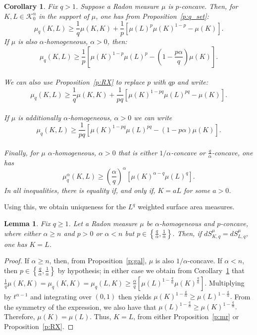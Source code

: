 \documentclass[11pt]{amsart}
\newtheorem{lemma}[theorem]{Lemma}
\newtheorem{corollary}[theorem]{Corollary}
\theoremstyle{definition}
\theoremstyle{remark}
\numberwithin{equation}{section}
\newcommand{\conbod}{\mathcal{K}^n}
\begin{document}
\begin{corollary}
\label{q_min_p}
Fix $q > 1$. Suppose a Radon measure $\mu$ is $p$-concave. Then, for $K,L\in\conbod_0$ in the support of $\mu$, one has from Proposition~\ref{p:q_set}:
$$\mu_q(K,L)\geq \frac{1}{q}\mu(K,K)+\frac{1}{p}\left[\mu(L)^p\mu(K)^{1-p}-\mu(K)\right].$$
If $\mu$ is also $\alpha$-homogeneous, $\alpha>0$, then:
$$\mu_q(K,L)\geq \frac{1}{p}\left[\mu(K)^{1-p}\mu(L)^{p}-\left(1-\frac{p\alpha}{q}\right)\mu(K)\right].$$
\\
We can also use Proposition~\ref{p:RX} to replace $p$ with $qp$ and write:
$$\mu_q(K,L)\geq \frac{1}{q}\mu(K,K)+ \frac{1}{pq}\left[\mu(K)^{1-pq}\mu(L)^{pq}-\mu(K)\right].$$
\\
If $\mu$ is additionally $\alpha$-homogeneous, $\alpha>0$ we can write
$$\mu_q(K,L)\geq  \frac{1}{pq}\left[\mu(K)^{1-pq}\mu(L)^{pq}-(1-p\alpha)\mu(K)\right].$$
\\
Finally, for $\mu$ $\alpha$-homogeneous, $\alpha>0$ that is either $1/\alpha$-concave or $\frac{q}{\alpha}$-concave, one has 
$$\mu^{\alpha}_q(K,L)\geq \left(\frac{\alpha}{q}\right)^{\alpha}\left[\mu(K)^{\alpha-q}\mu(L)^{q}\right].$$
In all inequalities, there is equality if, and only if, $K=aL$ for some $a>0$.
\end{corollary}
Using this, we obtain uniqueness for the $L^q$ weighted surface area measures.
\begin{lemma}
\label{l:q_meas_uni}
Fix $q\geq 1$. Let a Radon measure $\mu$ be $\alpha$-homogeneous and $p$-concave, where either $\alpha\geq n$ and $p>0$ or $\alpha<n$ but $p\in\left\{\frac{q}{\alpha},\frac{1}{\alpha}\right\}$. Then, if
$dS^{\mu}_{K,q}=dS^{\mu}_{L,q}$, one has $K=L$.
\end{lemma}
\begin{proof}
If $\alpha\geq n$, then, from Proposition~\ref{p:gal}, $\mu$ is also $1/\alpha$-concave. If $\alpha<n$, then $p\in\left\{\frac{q}{\alpha},\frac{1}{\alpha}\right\}$ by hypothesis; in either case we obtain from Corollary~\ref{q_min_p} that
$\frac{1}{q}\mu(K,K)=\mu_q(K,K)=\mu_q(L,K)\geq\frac{\alpha}{q}\left[\mu(L)^{1-\frac{q}{\alpha}}\mu(K)^{\frac{q}{\alpha}}\right].$
Multiplying by $t^{\alpha-1}$ and integrating over $(0,1)$ then yields
$\mu(K)^{1-\frac{q}{\alpha}}\geq \mu(L)^{1-\frac{q}{\alpha}}.$ From the symmetry of the expression, we also have that
$\mu(L)^{1-\frac{q}{\alpha}}\geq \mu(K)^{1-\frac{q}{\alpha}}.$ Therefore, $\mu(K)=\mu(L)$. Thus, $K=L$, from either Proposition~\ref{p:mr} or Proposition~\ref{p:RX}. 
\end{proof}
\end{document}
